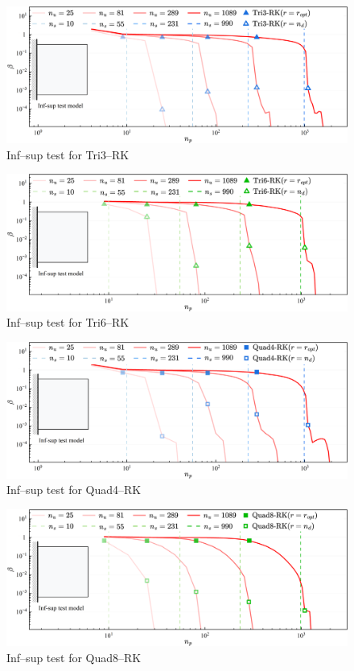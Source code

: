 \begin{figure}[H]
\centering
\includegraphics[width=\textwidth]{tri3.png}
\caption{Inf--sup test for Tri3--RK}\label{fg:infsup_convergence_2D_a}
\end{figure}

\begin{figure}[H]
\centering
\includegraphics[width=\textwidth]{tri6.png}\caption{Inf--sup test for Tri6--RK}\label{fg:infsup_convergence_2D_b}
\end{figure}

\begin{figure}[H]
\centering
\includegraphics[width=\textwidth]{quad4.png}\caption{Inf--sup test for Quad4--RK}\label{fg:infsup_convergence_2D_c}
\end{figure}

\begin{figure}[H]
\centering
\includegraphics[width=\textwidth]{quad8.png}\caption{Inf--sup test for Quad8--RK}\label{fg:infsup_convergence_2D_d}
\end{figure}

